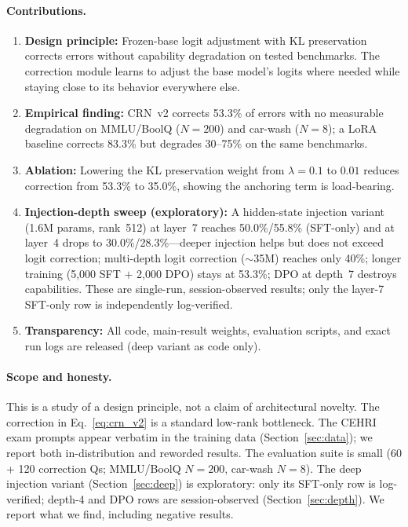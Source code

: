 \documentclass[11pt]{article}
\begin{document}
\paragraph{Contributions.}
\begin{enumerate}
\item \textbf{Design principle:} Frozen-base logit adjustment with KL preservation corrects errors without capability degradation on tested benchmarks.
The correction module learns to adjust the base model's logits where needed while staying close to its behavior everywhere else.
\item \textbf{Empirical finding:} CRN~v2 corrects 53.3\% of errors with no measurable degradation on MMLU/BoolQ ($N{=}200$) and car-wash ($N{=}8$); a LoRA baseline corrects 83.3\% but degrades 30--75\% on the same benchmarks.
\item \textbf{Ablation:} Lowering the KL preservation weight from $\lambda{=}0.1$ to $0.01$ reduces correction from 53.3\% to 35.0\%, showing the anchoring term is load-bearing.
\item \textbf{Injection-depth sweep (exploratory):} A hidden-state injection variant (1.6M params, rank~512) at layer~7 reaches 50.0\%/55.8\% (SFT-only) and at layer~4 drops to 30.0\%/28.3\%---deeper injection helps but does not exceed logit correction; multi-depth logit correction ($\sim$35M) reaches only 40\%; longer training (5{,}000 SFT $+$ 2{,}000 DPO) stays at 53.3\%; DPO at depth~7 destroys capabilities. These are single-run, session-observed results; only the layer-7 SFT-only row is independently log-verified.
\item \textbf{Transparency:} All code, main-result weights, evaluation scripts, and exact run logs are released (deep variant as code only).
\end{enumerate}

\paragraph{Scope and honesty.}
This is a study of a design principle, not a claim of architectural novelty.
The correction in Eq.~\ref{eq:crn_v2} is a standard low-rank bottleneck.
The CEHRI exam prompts appear verbatim in the training data (Section~\ref{sec:data}); we report both in-distribution and reworded results.
The evaluation suite is small (60 + 120 correction Qs; MMLU/BoolQ $N{=}200$, car-wash $N{=}8$).
The deep injection variant (Section~\ref{sec:deep}) is exploratory: only its SFT-only row is log-verified; depth-4 and DPO rows are session-observed (Section~\ref{sec:depth}).
We report what we find, including negative results.
\end{document}
